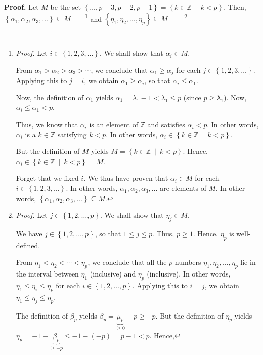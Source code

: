 \documentclass[numbers=enddot,12pt,final,onecolumn,notitlepage]{scrartcl}%
\theoremstyle{definition}
\newenvironment{proof}[1][Proof]{\noindent\textbf{#1.} }{\ \rule{0.5em}{0.5em}}
\newenvironment{verlong}{}{}
\begin{document}
\begin{verlong}
\begin{proof}
Let $M$ be the set $\left\{  \ldots,p-3,p-2,p-1\right\}  =\left\{
k\in\mathbb{Z}\ \mid\ k<p\right\}  $. Then, $\left\{  \alpha_{1},\alpha
_{2},\alpha_{3},\ldots\right\}  \subseteq M$\ \ \ \ \footnote{\textit{Proof.}
Let $i\in\left\{  1,2,3,\ldots\right\}  $. We shall show that $\alpha_{i}\in
M$.
\par
From $\alpha_{1}>\alpha_{2}>\alpha_{3}>\cdots$, we conclude that $\alpha
_{1}\geq\alpha_{j}$ for each $j\in\left\{  1,2,3,\ldots\right\}  $. Applying
this to $j=i$, we obtain $\alpha_{1}\geq\alpha_{i}$, so that $\alpha_{i}%
\leq\alpha_{1}$.
\par
Now, the definition of $\alpha_{1}$ yields $\alpha_{1}=\lambda_{1}%
-1<\lambda_{1}\leq p$ (since $p\geq\lambda_{1}$). Now, $\alpha_{i}\leq
\alpha_{1}<p$.
\par
Thus, we know that $\alpha_{i}$ is an element of $\mathbb{Z}$ and satisfies
$\alpha_{i}<p$. In other words, $\alpha_{i}$ is a $k\in\mathbb{Z}$ satisfying
$k<p$. In other words, $\alpha_{i}\in\left\{  k\in\mathbb{Z}\ \mid
\ k<p\right\}  $.
\par
But the definition of $M$ yields $M=\left\{  k\in\mathbb{Z}\ \mid
\ k<p\right\}  $. Hence, $\alpha_{i}\in\left\{  k\in\mathbb{Z}\ \mid
\ k<p\right\}  =M$.
\par
Forget that we fixed $i$. We thus have proven that $\alpha_{i}\in M$ for each
$i\in\left\{  1,2,3,\ldots\right\}  $. In other words, $\alpha_{1},\alpha
_{2},\alpha_{3},\ldots$ are elements of $M$. In other words, $\left\{
\alpha_{1},\alpha_{2},\alpha_{3},\ldots\right\}  \subseteq M$.} and $\left\{
\eta_{1},\eta_{2},\ldots,\eta_{p}\right\}  \subseteq M$%
\ \ \ \ \footnote{\textit{Proof.} Let $j\in\left\{  1,2,\ldots,p\right\}  $.
We shall show that $\eta_{j}\in M$.
\par
We have $j\in\left\{  1,2,\ldots,p\right\}  $, so that $1\leq j\leq p$. Thus,
$p\geq1$. Hence, $\eta_{p}$ is well-defined.
\par
From $\eta_{1}<\eta_{2}<\cdots<\eta_{p}$, we conclude that all the $p$ numbers
$\eta_{1},\eta_{2},\ldots,\eta_{p}$ lie in the interval between $\eta_{1}$
(inclusive) and $\eta_{p}$ (inclusive). In other words, $\eta_{1}\leq\eta
_{i}\leq\eta_{p}$ for each $i\in\left\{  1,2,\ldots,p\right\}  $. Applying
this to $i=j$, we obtain $\eta_{1}\leq\eta_{j}\leq\eta_{p}$.
\par
The definition of $\beta_{p}$ yields $\beta_{p}=\underbrace{\mu_{p}}_{\geq
0}-p\geq-p$. But the definition of $\eta_{p}$ yields $\eta_{p}%
=-1-\underbrace{\beta_{p}}_{\geq-p}\leq-1-\left(  -p\right)  =p-1<p$. Hence,
}
\end{proof}
\end{verlong}
\end{document}
